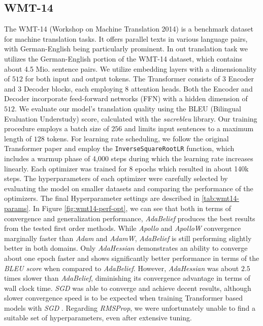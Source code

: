 \subsection{WMT-14}
The WMT-14 (Workshop on Machine Translation 2014) is a benchmark dataset for machine translation tasks.
It offers parallel texts in various language pairs, with German-English being particularly prominent.
In out translation task we utilizes the German-English portion of the WMT-14 dataset, which contains about 4.5 Mio. sentence pairs.
We utilize embedding layers with a dimensionality of $512$ for both input and output tokens.
The Transformer consists of $3$ Encoder and $3$ Decoder blocks, each employing $8$ attention heads.
Both the Encoder and Decoder incorporate feed-forward networks (FFN) with a hidden dimension of $512$.
We evaluate our model's translation quality using the BLEU (Bilingual Evaluation Understudy) score, calculated with the \emph{sacrebleu} library.
Our training procedure employs a batch size of $256$ and limits input sentences to a maximum length of $128$ tokens.
For learning rate scheduling, we follow the original Transformer paper \cite{AttentionIsAllUNeed} and employ the \texttt{InverseSquareRootLR} function,
which includes a warmup phase of 4,000 steps during which the learning rate increases linearly.
Each optimizer was trained for 8 epochs which resulted in about 140k steps.
The hyperparameters of each optimizer were carefully selected by evaluating the model on smaller datasets and comparing the performance of the optimizers.
The final Hyperparameter settings are described in \ref{tab:wmt14-params}. In Figure \ref{fig:wmt14-perf-opt}, we can see that both in terms of convergence and generalization performance, 
\emph{AdaBelief} produces the best results from the tested first order methods. While \emph{Apollo} and \emph{ApolloW} convergence marginally faster
than \emph{Adam} and \emph{AdamW}, \emph{AdaBelief} is still performing slightly better in both domains. Only \emph{AdaHessian} demonstrates an ability to converge about one epoch faster
and shows significantly better performance in terms of the \emph{BLEU score} when compared to \emph{AdaBelief}. However, \emph{AdaHessian} was about $2.5$ times slower than \emph{AdaBelief},
diminishing its convergence advantage in terms of wall clock time.
\emph{SGD} was able to converge and achieve decent results, although slower convergence speed is to be expected when training Transformer
based models with \emph{SGD} \cite{dao2020understanding}.
Regarding \emph{RMSProp}, we were unfortunately unable to find a suitable set of hyperparameters, even after extensive tuning.


